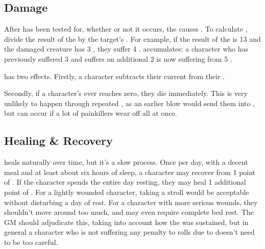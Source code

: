 \subsection{Damage}

After {\shock} has been tested for, whether or not it occurs, the {\damagetest} causes {\damage}.
To calculate {\damage}, divide the result of the {\damagetest} by the target's .
For example, if the result of the {\damagetest} is 13 and the damaged creature has 3 , they suffer 4 {\damage}.
{\damage} accumulates: a character who has previously suffered 3 {\damage} and suffers an additional 2 is now suffering from 5 {\damage}.

{\damage} has two effects.
Firstly, a character subtracts their current {\damage} from their .

Secondly, if a character's  ever reaches zero, they die immediately.
This is very unlikely to happen through repeated {\damage}, as an earlier blow would send them into {\shock}, but can occur if a lot of painkillers wear off all at once.

\subsection{Healing \& Recovery}

{\damage} heals naturally over time, but it's a slow process.
Once per day, with a decent meal and at least about six hours of sleep, a character may recover from 1 point of {\damage}.
If the character spends the entire day resting, they may heal 1 additional point of {\damage}.
For a lightly wounded character, taking a stroll would be acceptable without disturbing a day of rest.
For a character with more serious wounds, they shouldn't move around too much, and may even require complete bed rest.
The GM should adjudicate this, taking into account how the {\damage} was sustained, but in general a character who is not suffering any penalty to rolls due to {\damage} doesn't need to be too careful.

